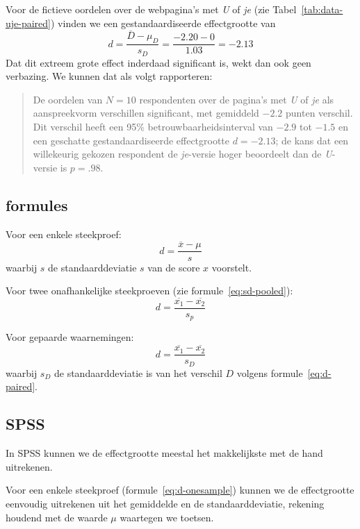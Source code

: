 \documentclass[
]{book}
\begin{document}
Voor de fictieve oordelen over de webpagina's met \emph{U} of \emph{je} (zie
Tabel~\ref{tab:data-uje-paired}) vinden we een gestandaardiseerde
effectgrootte van
\[d = \frac{ \overline{D}-\mu_D} {s_D} = \frac{ -2.20-0 } {1.03} = -2.13\]
Dat dit extreem grote effect inderdaad significant is, wekt dan ook geen
verbazing. We kunnen dat als volgt rapporteren:

\begin{quote}
De oordelen van \(N=10\) respondenten over de pagina's met \emph{U} of \emph{je}
als aanspreekvorm verschillen significant, met gemiddeld \(-2.2\) punten
verschil. Dit verschil heeft een 95\% betrouwbaarheidsinterval van
\(-2.9\) tot \(-1.5\) en een geschatte gestandaardiseerde effectgrootte
\(d=-2.13\); de kans dat een willekeurig gekozen respondent de
\emph{je}-versie hoger beoordeelt dan de \emph{U}-versie is \(p=.98\).
\end{quote}

\subsection{formules}\label{sec:formules13-5}

Voor een enkele steekproef:
\begin{equation}
   \label{eq:d-onesample}
  d = \frac{\overline{x}-\mu}{s}
\end{equation} waarbij \(s\) de standaarddeviatie \(s\) van de score \(x\)
voorstelt.

Voor twee onafhankelijke steekproeven (zie formule~\eqref{eq:sd-pooled}):
\begin{equation}
  \label{eq:d-homoskedastic}
  d = \frac{ \overline{x_1}-\overline{x_2} } { s_p }
\end{equation}

Voor gepaarde waarnemingen:
\begin{equation}
  \label{eq:d-paired}
  d = \frac{ \overline{x_1}-\overline{x_2} } { s_D }
\end{equation} waarbij \(s_D\) de standaarddeviatie is van het verschil
\(D\) volgens formule~\eqref{eq:d-paired}.

\subsection{SPSS}\label{spss-13-2}

In SPSS kunnen we de effectgrootte meestal het makkelijkste met de hand
uitrekenen.

Voor een enkele steekproef (formule~\eqref{eq:d-onesample}) kunnen we de
effectgrootte eenvoudig uitrekenen uit het gemiddelde en de
standaarddeviatie, rekening houdend met de waarde \(\mu\) waartegen we
toetsen.
\end{document}
